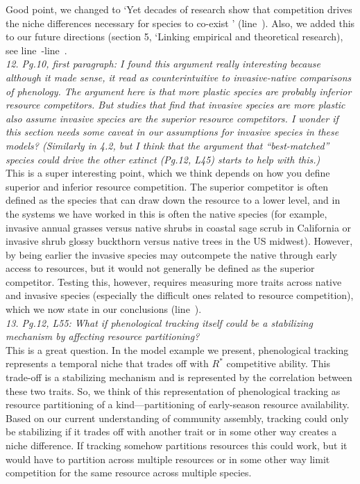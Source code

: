 \documentclass[11pt]{article}
\newcommand{\lr}[1]{line~\lineref{#1}}
\begin{document}
Good point, we changed to `Yet decades of research show that competition drives the niche differences necessary for species to co-exist \citep{Hutchinson:1959xi,Chesson:2000vd}' (\lr{r2whycomp}). Also, we added this to our future directions (section 5, `Linking empirical and theoretical research), see \lr{r2exp}-\lr{r2expend}.\\

\emph{12.     Pg.10, first paragraph: I found this argument really interesting because although it
made sense, it read as counterintuitive to invasive-native comparisons of phenology. The
argument here is that more plastic species are probably inferior resource competitors. But
studies that find that invasive species are more plastic also assume invasive species are the
superior resource competitors. I wonder if this section needs some caveat in our assumptions
for invasive species in these models? (Similarly in 4.2, but I think that the argument that
``best-matched'' species could drive the other extinct (Pg.12, L45) starts to help with this.)}\\

This is a super interesting point, which we think depends on how you define superior and inferior resource competition. The superior competitor is often defined as the species that can draw down the resource to a lower level, and in the systems we have worked in this is often the native species (for example, invasive annual grasses versus native shrubs in coastal sage scrub in California or invasive shrub glossy buckthorn versus native trees in the US midwest). However, by being earlier the invasive species may outcompete the native through early access to resources, but it would not generally be defined as the superior competitor. Testing this, however, requires measuring more traits across native and invasive species (especially the difficult ones related to resource competition), which we now state in our conclusions (\lr{r2invas}).\\

\emph{13.     Pg.12, L55: What if phenological tracking itself could be a stabilizing mechanism by
affecting resource partitioning?}\\

This is a great question. In the model example we present, phenological tracking represents a temporal niche that trades off with $R^*$ competitive ability.  This trade-off is a stabilizing mechanism and is represented by the correlation between these two traits.  So, we think of this representation of phenological tracking as resource partitioning of a kind---partitioning of early-season resource availability.   Based on our current understanding of community assembly, tracking could only be stabilizing if it trades off with another trait or in some other way creates a niche difference. If tracking somehow partitions resources this could work, but it would have to partition across multiple resources or in some other way limit competition for the same resource across multiple species.  \\
\end{document}
